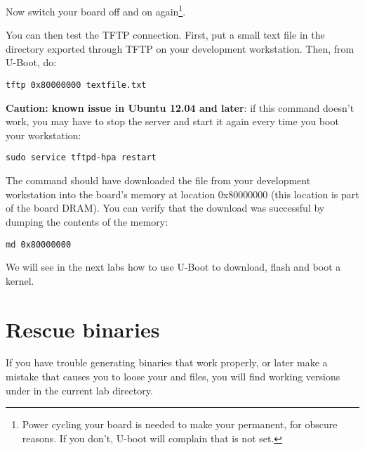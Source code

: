 Now switch your board off and on again\footnote{Power cycling your
  board is needed to make your  permanent, for obscure
  reasons. If you don't, U-boot will complain that  is not
  set.}.

You can then test the TFTP connection. First, put a small text file in
the directory exported through TFTP on your development
workstation. Then, from U-Boot, do:

\begin{verbatim}
tftp 0x80000000 textfile.txt
\end{verbatim}

{\bf Caution: known issue in Ubuntu 12.04 and later}:
if this command doesn't work, you may have to stop the server
and start it again every time you boot your workstation:

\begin{verbatim}
sudo service tftpd-hpa restart
\end{verbatim}

The  command should have downloaded
the  file from your development
workstation into the board's memory at location 0x80000000 (this
location is part of the board DRAM). You can verify that the download
was successful by dumping the contents of the memory:

\begin{verbatim}
md 0x80000000
\end{verbatim}

We will see in the next labs how to use U-Boot to download, flash and
boot a kernel.

\section{Rescue binaries}

If you have trouble generating binaries that work properly, or later
make a mistake that causes you to loose your  and
 files, you will find working versions under
 in the current lab directory.
